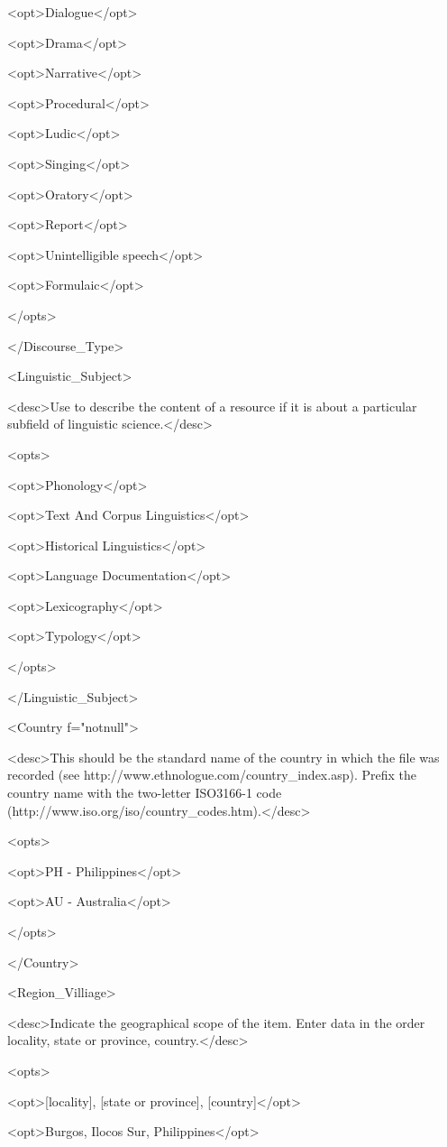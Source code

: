 <opt>Dialogue</opt>

<opt>Drama</opt>

<opt>Narrative</opt>

<opt>Procedural</opt>

<opt>Ludic</opt>

<opt>Singing</opt>

<opt>Oratory</opt>

<opt>Report</opt>

<opt>Unintelligible speech</opt>

<opt>Formulaic</opt>

</opts>

</Discourse_Type>

<Linguistic_Subject>

<desc>Use to describe the content of a resource if it is about a particular subfield of linguistic science.</desc>

<opts>

<opt>Phonology</opt>

<opt>Text And Corpus Linguistics</opt>

<opt>Historical Linguistics</opt>

<opt>Language Documentation</opt>

<opt>Lexicography</opt>

<opt>Typology</opt>

</opts>

</Linguistic_Subject>

<Country f="notnull">

<desc>This should be the standard name of the country in which the file was recorded (see http://www.ethnologue.com/country_index.asp). Prefix the country name with the two-letter ISO3166-1 code (http://www.iso.org/iso/country_codes.htm).</desc>

<opts>

<opt>PH - Philippines</opt>

<opt>AU - Australia</opt>

</opts>

</Country>

<Region_Villiage>

<desc>Indicate the geographical scope of the item. Enter data in the order locality, state or province, country.</desc>

<opts>

<opt>{[}locality{]}, {[}state or province{]}, {[}country{]}</opt>

<opt>Burgos, Ilocos Sur, Philippines</opt>

